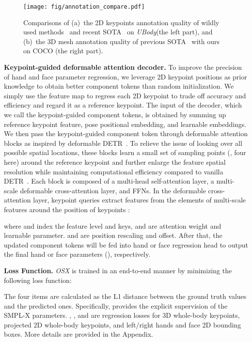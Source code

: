 \documentclass[10pt,twocolumn,letterpaper]{article}
\newcommand{\modelname}{\emph{OSX}\xspace}
\newcommand{\dataname}{\emph{UBody}\xspace}
\begin{document}
\begin{figure*}[h]
\begin{center}
\texttt{[image: fig/annotation\_compare.pdf]}
\end{center}
\vspace{-0.5cm}
\caption{
Comparisons of (a)~the 2D keypoints annotation quality of wildly used methods~\cite{ZheCao2018OpenPoseRM,FanZhang2020MediaPipeHO} and recent SOTA~\cite{YufeiXu2022ViTPoseSV} on \dataname (the left part), and (b)~the 3D mesh annotation quality of previous SOTA~\cite{Moon_2022NeuralAnnot} with ours on COCO (the right part).
}
\label{fig:ubody_vis_2d}
\vspace{-0.1cm}
\end{figure*}
\noindent \textbf{Keypoint-guided deformable attention decoder.}
To improve the precision of hand and face parameter regression, we leverage 2D keypoint positions as prior knowledge to obtain better component tokens  than random initialization.
We simply use the feature map  to regress each 2D keypoint to trade off accuracy and efficiency and regard it as a reference keypoint. The input  of the decoder, which we call the keypoint-guided component tokens, is obtained by summing up reference keypoint feature, pose positional embedding, and learnable embeddings.
We then pass the keypoint-guided component token through  deformable attention blocks as inspired by deformable DETR~\cite{Zhu_detr21}. To relieve the issue of looking over all possible spatial locations, these blocks learn a small set of sampling points (\eg, four here) around the reference keypoint and further enlarge the feature spatial resolution while maintaining computational efficiency compared to vanilla DETR~\cite{carion2020detr}.
Each block is composed of a multi-head self-attention layer, a multi-scale deformable cross-attention layer, and FFNs. In the deformable cross-attention layer, keypoint queries  extract features from the elements of multi-scale features  around the position of keypoints :

where  and  index the feature level and keys,  and   are attention weight and learnable parameter.  and  are position rescaling and offset. After that, the updated component tokens  will be fed into hand or face regression head to output the final hand or face parameters (), respectively.

\noindent \textbf{Loss Function.}
\modelname is trained in an end-to-end manner by minimizing the following loss function:

The four items are calculated as the L1 distance between the ground truth values and the predicted ones. Specifically,  provides the explicit supervision of the SMPL-X parameters. , , and  are regression losses for 3D whole-body keypoints, projected 2D whole-body keypoints, and left/right hands and face 2D bounding boxes. More details are provided in the Appendix. 
\end{document}
